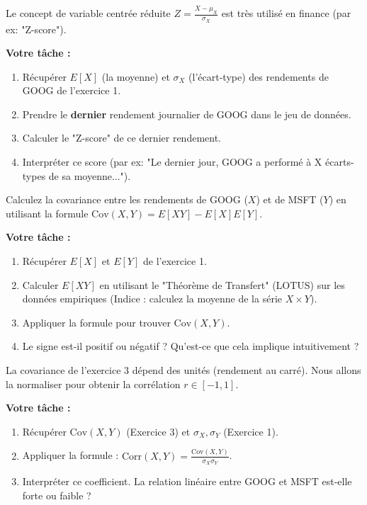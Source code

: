 \begin{exercicebox}
Le concept de variable centrée réduite $Z = \frac{X - \mu_X}{\sigma_X}$ est très utilisé en finance (par ex: "Z-score").

\textbf{Votre tâche :}
\begin{enumerate}
    \item Récupérer $E[X]$ (la moyenne) et $\sigma_X$ (l'écart-type) des rendements de GOOG de l'exercice 1.
    \item Prendre le \textbf{dernier} rendement journalier de GOOG dans le jeu de données.
    \item Calculer le "Z-score" de ce dernier rendement.
    \item Interpréter ce score (par ex: "Le dernier jour, GOOG a performé à X écarts-types de sa moyenne...").
\end{enumerate}
\end{exercicebox}

\begin{exercicebox}
Calculez la covariance entre les rendements de GOOG ($X$) et de MSFT ($Y$) en utilisant la formule $\text{Cov}(X,Y) = E[XY] - E[X]E[Y]$.

\textbf{Votre tâche :}
\begin{enumerate}
    \item Récupérer $E[X]$ et $E[Y]$ de l'exercice 1.
    \item Calculer $E[XY]$ en utilisant le "Théorème de Transfert" (LOTUS) sur les données empiriques (Indice : calculez la moyenne de la série $X \times Y$).
    \item Appliquer la formule pour trouver $\text{Cov}(X,Y)$.
    \item Le signe est-il positif ou négatif ? Qu'est-ce que cela implique intuitivement ?
\end{enumerate}
\end{exercicebox}

\begin{exercicebox}
La covariance de l'exercice 3 dépend des unités (rendement au carré). Nous allons la normaliser pour obtenir la corrélation $r \in [-1, 1]$.

\textbf{Votre tâche :}
\begin{enumerate}
    \item Récupérer $\text{Cov}(X,Y)$ (Exercice 3) et $\sigma_X, \sigma_Y$ (Exercice 1).
    \item Appliquer la formule : $\text{Corr}(X,Y) = \frac{\text{Cov}(X,Y)}{\sigma_X \sigma_Y}$.
    \item Interpréter ce coefficient. La relation linéaire entre GOOG et MSFT est-elle forte ou faible ?
\end{enumerate}
\end{exercicebox}

